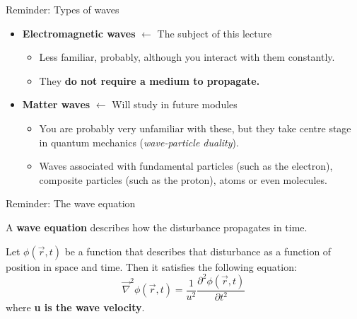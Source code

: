 {\begin{frame}{Reminder: Types of waves}
\begin{itemize}
\item {\bf Electromagnetic waves} {\color{red} $\leftarrow$ The subject of this lecture}\\
    \begin{itemize}
        \item Less familiar, probably, although you interact with them constantly.
        \item They {\bf do not require a medium to propagate.}
    \end{itemize}

\item {\bf Matter waves}  {\color{red} $\leftarrow$ Will study in future modules}\\
    \begin{itemize}
          \item You are probably very unfamiliar with these, but they take centre stage
                    in quantum mechanics ({\em wave-particle duality}).
          \item Waves associated with fundamental particles (such as the electron),
                    composite particles (such as the proton), atoms or even molecules.
    \end{itemize}

\end{itemize}

\end{frame}

%
%
%
%

\begin{frame}{Reminder: The wave equation}

A {\bf wave equation} describes how the disturbance propagates in time.\\

\vspace{0.3cm}

Let $\phi(\vec{r}, t)$ be a function that describes that disturbance as a function of position in space and time.
Then it satisfies the following equation:
\begin{equation*}
   \vec{\nabla}^{2} \phi(\vec{r}, t) = \frac{1}{u^2} \frac{\partial^{2} \phi(\vec{r}, t)} {\partial t^{2}}
\end{equation*}
where {\bf u is the wave velocity}.\\

\vspace{0.3cm}


\end{frame}}

